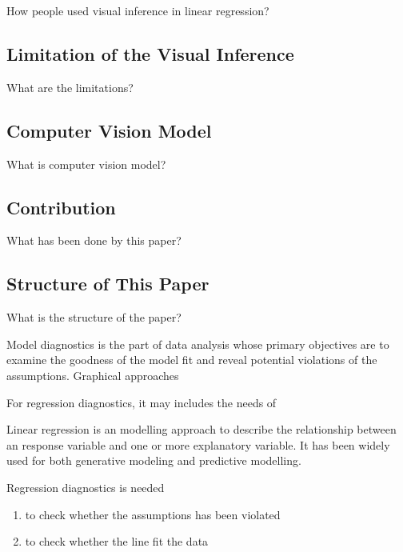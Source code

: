 \documentclass{monashthesis}
\begin{document}
How people used visual inference in linear regression?

\hypertarget{limitation-of-the-visual-inference}{%
\subsection{Limitation of the Visual Inference}\label{limitation-of-the-visual-inference}}

What are the limitations?

\hypertarget{computer-vision-model}{%
\subsection{Computer Vision Model}\label{computer-vision-model}}

What is computer vision model?

\hypertarget{contribution}{%
\subsection{Contribution}\label{contribution}}

What has been done by this paper?

\hypertarget{structure-of-this-paper}{%
\subsection{Structure of This Paper}\label{structure-of-this-paper}}

What is the structure of the paper?

Model diagnostics is the part of data analysis whose primary objectives are to examine the goodness of the model fit and reveal potential violations of the assumptions. Graphical approaches

For regression diagnostics, it may includes the needs of

Linear regression is an modelling approach to describe the relationship between an response variable and one or more explanatory variable. It has been widely used for both generative modeling and predictive modelling.

Regression diagnostics is needed

\begin{enumerate}
\def\labelenumi{\arabic{enumi}.}
\tightlist
\item
  to check whether the assumptions has been violated
\item
  to check whether the line fit the data
\end{enumerate}
\end{document}
